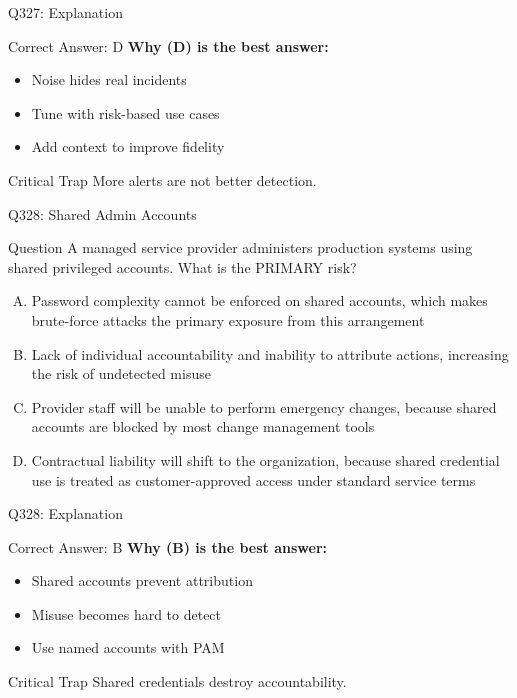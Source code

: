 \documentclass{beamer}
\begin{document}
	\begin{frame}{Q327: Explanation}
		\begin{block}{Correct Answer: D}
			\textbf{Why (D) is the best answer:}
			\begin{itemize}
				\item Noise hides real incidents
				\item Tune with risk-based use cases
				\item Add context to improve fidelity
			\end{itemize}
		\end{block}
		\begin{alertblock}{Critical Trap}
			More alerts are not better detection.
		\end{alertblock}
	\end{frame}
	
	\begin{frame}{Q328: Shared Admin Accounts}
		\begin{block}{Question}
			\small A managed service provider administers production systems using shared privileged accounts. What is the PRIMARY risk?
		\end{block}
		\begin{enumerate}[(A)]
			\footnotesize
			\item Password complexity cannot be enforced on shared accounts, which makes brute-force attacks the primary exposure from this arrangement
			\item Lack of individual accountability and inability to attribute actions, increasing the risk of undetected misuse
			\item Provider staff will be unable to perform emergency changes, because shared accounts are blocked by most change management tools
			\item Contractual liability will shift to the organization, because shared credential use is treated as customer-approved access under standard service terms
		\end{enumerate}
	\end{frame}
	
	\begin{frame}{Q328: Explanation}
		\begin{block}{Correct Answer: B}
			\textbf{Why (B) is the best answer:}
			\begin{itemize}
				\item Shared accounts prevent attribution
				\item Misuse becomes hard to detect
				\item Use named accounts with PAM
			\end{itemize}
		\end{block}
		\begin{alertblock}{Critical Trap}
			Shared credentials destroy accountability.
		\end{alertblock}
	\end{frame}
	
\end{document}
